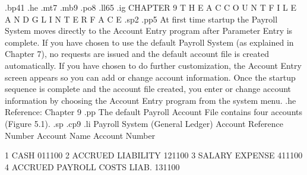 .bp41
.he
.mt7
.mb9
.po8
.ll65
.ig
CHAPTER 9
T H E	 A C C O U N T	  F I L E
A N D	 G L	I N T E R F A C E
.sp2
.pp5
At first time startup the Payroll System moves directly to
the Account Entry program after Parameter Entry is complete.
If you have chosen to use the default Payroll System (as explained in
Chapter 7), no requests are issued and the default account file is
created automatically.	If you have chosen to do further customization,
the Account Entry screen appears so you can add or change account
information.
Once the startup sequence
is complete and the account file created,
you enter or change account
information by choosing the Account Entry program from the system menu.
.he Reference: Chapter 9
.pp
The default Payroll Account File contains four accounts (Figure 5.1).
.sp
.cp9
.li
      Payroll System				 (General Ledger)
 Account Reference Number     Account Name	  Account Number

	   1		 CASH			      011100
	   2		 ACCRUED LIABILITY	      121100
	   3		 SALARY EXPENSE 	      411100
	   4		 ACCRUED PAYROLL COSTS LIAB.  131100


